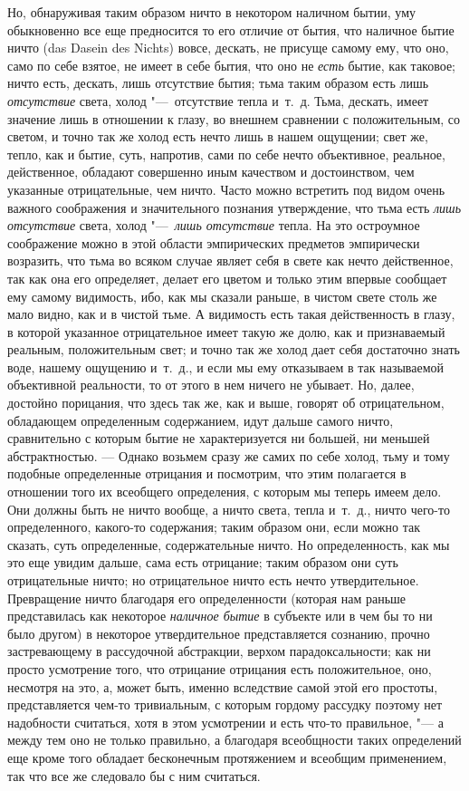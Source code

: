 Но, обнаруживая таким образом ничто в некотором наличном бытии, уму
обыкновенно все еще предносится то его отличие от бытия, что наличное бытие
ничто (das Dasein des Nichts) вовсе, дескать, не присуще самому ему, что
оно, само по себе взятое, не имеет в себе бытия, что оно не
{\em есть} бытие, как таковое; ничто есть, дескать,
лишь отсутствие бытия; тьма таким образом есть лишь
{\em отсутствие} света, холод "---~отсутствие тепла
и~т.~д. Тьма, дескать, имеет значение лишь в отношении к глазу, во внешнем
сравнении с положительным, со светом, и точно так же холод есть нечто лишь
в нашем ощущении; свет же, тепло, как и бытие, суть, напротив, сами по себе
нечто объективное, реальное, действенное, обладают совершенно иным
качеством и достоинством, чем указанные отрицательные, чем ничто. Часто
можно встретить под видом очень важного соображения и значительного
познания утверждение, что тьма есть {\em лишь
отсутствие} света, холод "---~{\em лишь отсутствие} тепла.
На это остроумное соображение можно в этой области эмпирических предметов
эмпирически возразить, что тьма во всяком случае являет себя в свете как
нечто действенное, так как она его определяет, делает его цветом и только
этим впервые сообщает ему самому видимость, ибо, как мы сказали раньше, в
чистом свете столь же мало видно, как и в чистой тьме. А видимость есть
такая действенность в глазу, в которой указанное отрицательное имеет такую
же долю, как и признаваемый реальным, положительным свет; и точно так же
холод дает себя достаточно знать воде, нашему ощущению и~т.~д., и если мы
ему отказываем в так называемой объективной реальности, то от этого в нем
ничего не убывает. Но, далее, достойно порицания, что здесь так же, как и
выше, говорят об отрицательном, обладающем определенным содержанием, идут
дальше самого ничто, сравнительно с которым бытие не характеризуется ни
большей, ни меньшей абстрактностью. --- Однако возьмем сразу же самих по себе
холод, тьму и тому подобные определенные отрицания и посмотрим, что этим
полагается в отношении того их всеобщего определения, с которым мы теперь
имеем дело. Они должны быть не ничто вообще, а ничто света, тепла и~т.~д.,
ничто чего-то определенного, какого-то содержания; таким образом они, если
можно так сказать, суть определенные, содержательные ничто. Но
определенность, как мы это еще увидим дальше, сама есть отрицание; таким
образом они суть отрицательные ничто; но отрицательное ничто есть нечто
утвердительное. Превращение ничто благодаря его определенности (которая нам
раньше представилась как некоторое {\em наличное бытие}
в субъекте или в чем бы то ни было другом) в некоторое утвердительное
представляется сознанию, прочно застревающему в рассудочной абстракции,
верхом парадоксальности; как ни просто усмотрение того, что отрицание
отрицания есть положительное, оно, несмотря на это, а, может быть, именно
вследствие самой этой его простоты, представляется чем-то тривиальным, с
которым гордому рассудку поэтому нет надобности считаться, хотя в этом
усмотрении и есть что-то правильное, "--- а между тем оно не только правильно,
а благодаря всеобщности таких определений еще кроме того обладает
бесконечным протяжением и всеобщим применением, так что все же следовало бы
с ним считаться.

